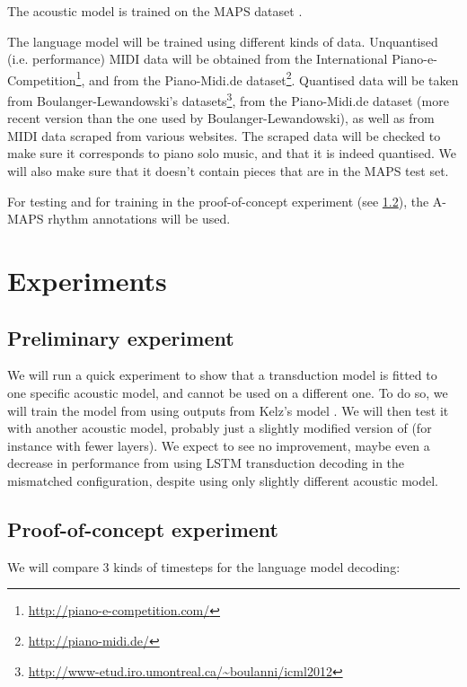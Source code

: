 \documentclass{article}
\begin{document}
The acoustic model is trained on the MAPS dataset \cite{emiya2010multipitch}.

The language model will be trained using different kinds of data.
Unquantised (i.e. performance) MIDI data will be obtained from the International Piano-e-Competition\footnote{\url{http://piano-e-competition.com/}},
and from the Piano-Midi.de dataset\footnote{\url{http://piano-midi.de/}}.
Quantised data will be taken from Boulanger-Lewandowski's datasets\footnote{\url{http://www-etud.iro.umontreal.ca/~boulanni/icml2012}},
from the Piano-Midi.de dataset (more recent version than the one used by Boulanger-Lewandowski),
as well as from MIDI data scraped from various websites.
The scraped data will be checked to make sure it corresponds to piano solo music, and that it is indeed quantised.
We will also make sure that it doesn't contain pieces that are in the MAPS test set.

For testing and for training in the proof-of-concept experiment (see \ref{sec:POC}), the A-MAPS \cite{ycart2018maps} rhythm annotations will be used.

\section{Experiments}

\subsection{Preliminary experiment}

We will run a quick experiment to show that a transduction model is fitted to one specific acoustic model, and cannot be used on a different one.
To do so, we will train the model from \cite{ycart2018polyphonic} using outputs from Kelz's model \cite{Kelz2016}.
We will then test it with another acoustic model, probably just a slightly modified version of  \cite{Kelz2016} (for instance with fewer layers).
We expect to see no improvement, maybe even a decrease in performance from using LSTM transduction decoding in the mismatched configuration, despite using only slightly different acoustic model.

\subsection{Proof-of-concept experiment}
\label{sec:POC}

We will compare 3 kinds of timesteps for the language model decoding:
\end{document}
